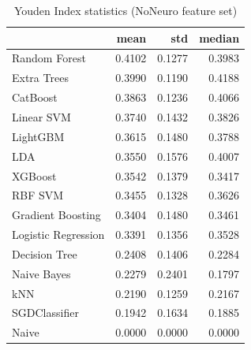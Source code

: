 \begin{table}
\caption{Youden Index statistics (NoNeuro feature set)}
\label{tab:youden_NoNeuro_stats}
\begin{tabular}{lrrr}
\toprule
 & mean & std & median \\
\midrule
Random Forest & 0.4102 & 0.1277 & 0.3983 \\
Extra Trees & 0.3990 & 0.1190 & 0.4188 \\
CatBoost & 0.3863 & 0.1236 & 0.4066 \\
Linear SVM & 0.3740 & 0.1432 & 0.3826 \\
LightGBM & 0.3615 & 0.1480 & 0.3788 \\
LDA & 0.3550 & 0.1576 & 0.4007 \\
XGBoost & 0.3542 & 0.1379 & 0.3417 \\
RBF SVM & 0.3455 & 0.1328 & 0.3626 \\
Gradient Boosting & 0.3404 & 0.1480 & 0.3461 \\
Logistic Regression & 0.3391 & 0.1356 & 0.3528 \\
Decision Tree & 0.2408 & 0.1406 & 0.2284 \\
Naive Bayes & 0.2279 & 0.2401 & 0.1797 \\
kNN & 0.2190 & 0.1259 & 0.2167 \\
SGDClassifier & 0.1942 & 0.1634 & 0.1885 \\
Naive & 0.0000 & 0.0000 & 0.0000 \\
\bottomrule
\end{tabular}
\end{table}
